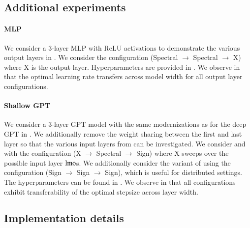 \subsection{Additional experiments}


\paragraph{MLP}
We consider a 3-layer MLP with ReLU activations to demonstrate the various output layers in .
We consider the configuration (Spectral $\rightarrow$ Spectral $\rightarrow$ X) where X is the output layer.
Hyperparameters are provided in .
We observe in  that the optimal learning rate transfers across model width for all output layer configurations.

\paragraph{Shallow GPT}
We consider a 3-layer GPT model \citep{karpathy2023nanogpt} with the same modernizations as for the deep GPT in .
We additionally remove the weight sharing between the first and last layer so that the various input layers from  can be investigated.
We consider \Scion and \uScion with the configuration (X $\rightarrow$ Spectral $\rightarrow$ Sign) where X sweeps over the possible input layer $\operatorname{lmo}$s.
We additionally consider the variant of \uScion using the configuration (Sign $\rightarrow$ Sign $\rightarrow$ Sign), which is useful for distributed settings.
The hyperparameters can be found in .
We observe in  that all configurations exhibit transferability of the optimal stepsize across layer width.


\subsection{Implementation details}\label{app:impl}

